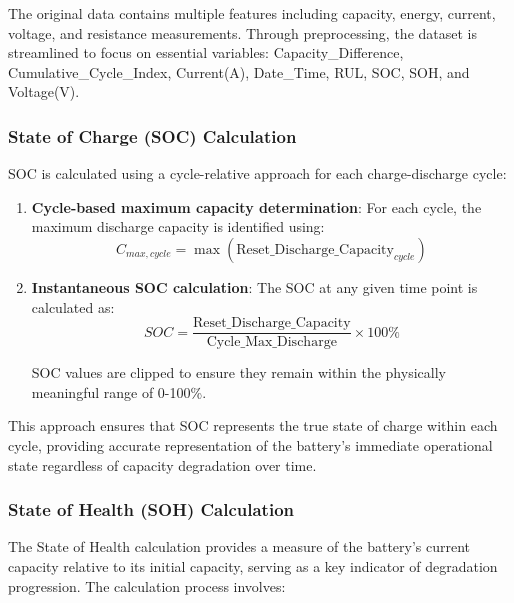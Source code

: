 The original data contains multiple features including capacity, energy, current, voltage, and resistance measurements. Through preprocessing, the dataset is streamlined to focus on essential variables: Capacity\_Difference, Cumulative\_Cycle\_Index, Current(A), Date\_Time, RUL, SOC, SOH, and Voltage(V).

\subsubsection{State of Charge (SOC) Calculation}
\label{subsubsec:soc_calculation}

SOC is calculated using a cycle-relative approach for each charge-discharge cycle:

\begin{enumerate}
    \item \textbf{Cycle-based maximum capacity determination}: For each cycle, the maximum discharge capacity is identified using:
    \begin{equation}
        C_{max,cycle} = \max(\text{Reset\_Discharge\_Capacity}_{cycle})
    \end{equation}
    
    \item \textbf{Instantaneous SOC calculation}: The SOC at any given time point is calculated as:
    \begin{equation}
        SOC = \frac{\text{Reset\_Discharge\_Capacity}}{\text{Cycle\_Max\_Discharge}} \times 100\%
    \end{equation}
    
    SOC values are clipped to ensure they remain within the physically meaningful range of 0-100\%.
\end{enumerate}

This approach ensures that SOC represents the true state of charge within each cycle, providing accurate representation of the battery's immediate operational state regardless of capacity degradation over time.

\subsubsection{State of Health (SOH) Calculation}
\label{subsubsec:soh_calculation}

The State of Health calculation provides a measure of the battery's current capacity relative to its initial capacity, serving as a key indicator of degradation progression. The calculation process involves:

